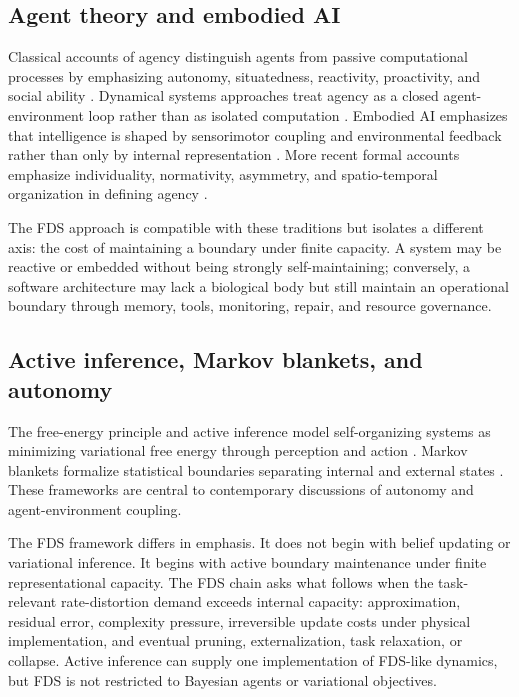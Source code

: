 \documentclass[10pt,a4paper,twocolumn,aps,prl]{revtex4-2}
\begin{document}
\subsection{Agent theory and embodied AI}

Classical accounts of agency distinguish agents from passive computational processes by emphasizing autonomy, situatedness, reactivity, proactivity, and social ability \cite{wooldridge1995intelligent}. Dynamical systems approaches treat agency as a closed agent-environment loop rather than as isolated computation \cite{beer1995dynamical}. Embodied AI emphasizes that intelligence is shaped by sensorimotor coupling and environmental feedback rather than only by internal representation \cite{brooks1991intelligence}. More recent formal accounts emphasize individuality, normativity, asymmetry, and spatio-temporal organization in defining agency \cite{barandiaran2009defining}.

The FDS approach is compatible with these traditions but isolates a different axis: the cost of maintaining a boundary under finite capacity. A system may be reactive or embedded without being strongly self-maintaining; conversely, a software architecture may lack a biological body but still maintain an operational boundary through memory, tools, monitoring, repair, and resource governance.

\subsection{Active inference, Markov blankets, and autonomy}

The free-energy principle and active inference model self-organizing systems as minimizing variational free energy through perception and action \cite{friston2010free,friston2017active}. Markov blankets formalize statistical boundaries separating internal and external states \cite{kirchhoff2018markov}. These frameworks are central to contemporary discussions of autonomy and agent-environment coupling.

The FDS framework differs in emphasis. It does not begin with belief updating or variational inference. It begins with active boundary maintenance under finite representational capacity. The FDS chain asks what follows when the task-relevant rate-distortion demand exceeds internal capacity: approximation, residual error, complexity pressure, irreversible update costs under physical implementation, and eventual pruning, externalization, task relaxation, or collapse. Active inference can supply one implementation of FDS-like dynamics, but FDS is not restricted to Bayesian agents or variational objectives.
\end{document}
